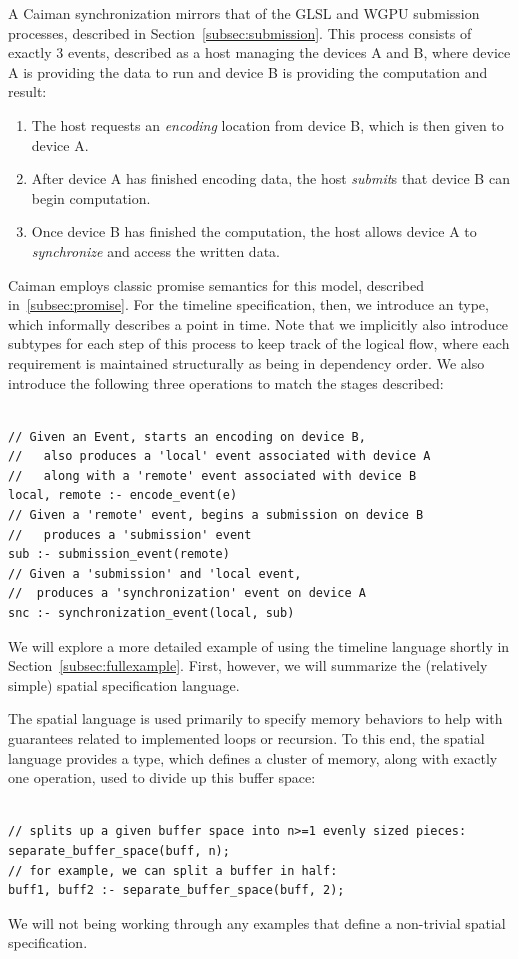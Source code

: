 A Caiman synchronization mirrors that of the GLSL and WGPU submission processes, described in Section~\ref{subsec:submission}.  This process consists of exactly 3 events, described as a host managing the devices A and B, where device A is providing the data to run and device B is providing the computation and result:
%
\begin{enumerate}
\item The host requests an \emph{encoding} location from device B, which is then given to device A.
\item After device A has finished encoding data, the host \emph{submit}s that device B can begin computation.
\item Once device B has finished the computation, the host allows device A to \emph{synchronize} and access the written data.
\end{enumerate}
%
Caiman employs classic promise semantics for this model, described in~\ref{subsec:promise}.  For the timeline specification, then, we introduce an  type, which informally describes a point in time.  Note that we implicitly also introduce subtypes for each step of this process to keep track of the logical flow, where each requirement is maintained structurally as being in dependency order. We also introduce the following three operations to match the stages described:
%
\begin{lstlisting}

// Given an Event, starts an encoding on device B,
//   also produces a 'local' event associated with device A
//   along with a 'remote' event associated with device B
local, remote :- encode_event(e)
// Given a 'remote' event, begins a submission on device B
//   produces a 'submission' event
sub :- submission_event(remote)
// Given a 'submission' and 'local event, 
//  produces a 'synchronization' event on device A
snc :- synchronization_event(local, sub)
\end{lstlisting}
%
We will explore a more detailed example of using the timeline language shortly in Section~\ref{subsec:fullexample}.  First, however, we will summarize the (relatively simple) spatial specification language.

The spatial language is used primarily to specify memory behaviors to help with guarantees related to implemented loops or recursion.  To this end, the spatial language provides a  type, which defines a cluster of memory, along with exactly one operation, used to divide up this buffer space:
%
\begin{lstlisting}

// splits up a given buffer space into n>=1 evenly sized pieces:
separate_buffer_space(buff, n);
// for example, we can split a buffer in half:
buff1, buff2 :- separate_buffer_space(buff, 2);
\end{lstlisting}
%
We will not being working through any examples that define a non-trivial spatial specification.


